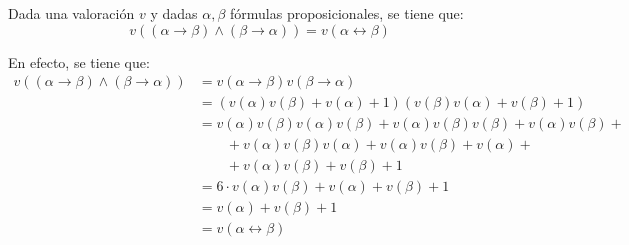 \begin{ejemplo}
    Dada una valoración $v$ y dadas $\alpha,\beta$ fórmulas proposicionales, se tiene que:
    \begin{equation*}
        v\left((\alpha\rightarrow\beta) \land (\beta\rightarrow\alpha)\right) = 
        v(\alpha\leftrightarrow\beta)
    \end{equation*}

    En efecto, se tiene que:
    \begin{align*}
        v\left((\alpha\rightarrow\beta) \land (\beta\rightarrow\alpha)\right)
        &= v(\alpha\rightarrow\beta)v(\beta\rightarrow\alpha)\\
        &= \left(v(\alpha)v(\beta)+v(\alpha)+1\right)\left(v(\beta)v(\alpha)+v(\beta)+1\right)\\
        &= v(\alpha)v(\beta)v(\alpha)v(\beta) + v(\alpha)v(\beta)v(\beta) + v(\alpha)v(\beta) +\\
        &\qquad + v(\alpha)v(\beta)v(\alpha) + v(\alpha)v(\beta) + v(\alpha) +\\
        &\qquad + v(\alpha)v(\beta)+ v(\beta) + 1\\
        &= 6\cdot v(\alpha)v(\beta) + v(\alpha) + v(\beta) + 1\\
        &= v(\alpha) + v(\beta) + 1\\
        &= v(\alpha\leftrightarrow\beta)
    \end{align*}
\end{ejemplo}

